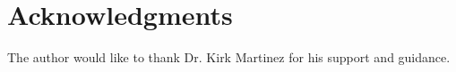 \documentclass[journal]{IEEEtran}
\begin{document}

%


\appendices



\section*{Acknowledgments}


The author would like to thank Dr. Kirk Martinez for his support and guidance.


\ifCLASSOPTIONcaptionsoff
  \newpage
\fi



\end{document}
